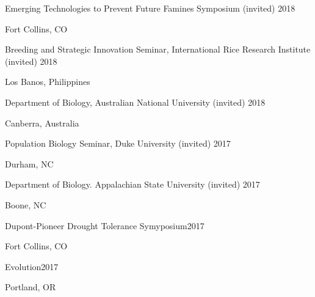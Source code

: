 \documentclass[12pt,english]{article}
\begin{document}
\hspace*{1.0em}Emerging Technologies to Prevent Future Famines Symposium (invited) \hfill 2018 \par
\hspace*{2.0em}Fort Collins, CO \par\vspace{0.5ex}

\hspace*{1.0em}Breeding and Strategic Innovation Seminar, International Rice Research Institute (invited) \hfill 2018 \par
\hspace*{2.0em}Los Banos, Philippines \par\vspace{0.5ex}

\hspace*{1.0em}Department of Biology, Australian National University (invited) \hfill 2018 \par
\hspace*{2.0em}Canberra, Australia \par\vspace{0.5ex}

\hspace*{1.0em}Population Biology Seminar,  Duke University (invited) \hfill 2017 \par
\hspace*{2.0em}Durham, NC \par\vspace{0.5ex}

\hspace*{1.0em}Department of Biology. Appalachian State University (invited) \hfill 2017 \par
\hspace*{2.0em}Boone, NC  \par\vspace{0.5ex}

\hspace*{1.0em}Dupont-Pioneer Drought Tolerance Symyposium\hfill 2017 \par
\hspace*{2.0em}Fort Collins, CO \par\vspace{0.5ex}

\hspace*{1.0em}Evolution\hfill 2017 \par
\hspace*{2.0em}Portland, OR \par\vspace{0.5ex}
\end{document}
